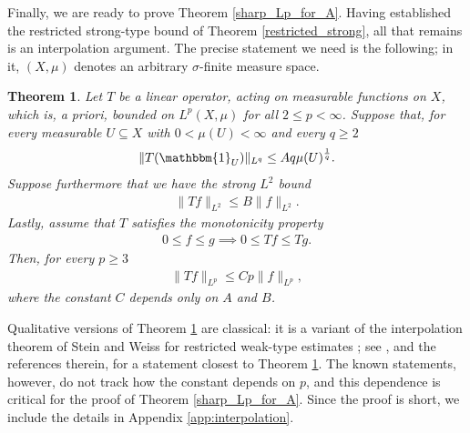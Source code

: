 \documentclass[oneside]{amsart}
\newtheorem{theorem}{Theorem}
\theoremstyle{definition}
\theoremstyle{plain}
\numberwithin{equation}{section}
\numberwithin{theorem}{section}
\newcommand{\ind}{\mathbbm{1}}
\begin{document}
Finally, we are ready to prove Theorem \ref{sharp_Lp_for_A}.
Having established the restricted strong-type bound of Theorem
\ref{restricted_strong}, all that remains is an interpolation argument.
The precise statement we need is the following; in it, $(X, \mu)$ denotes
an arbitrary $\sigma$-finite measure space.
\begin{theorem} \label{interpolation}
  Let $T$ be a linear operator, acting on measurable functions on $X$,
  which is, a priori, bounded on $L^p(X, \mu)$ for all
  $2 \leq p < \infty$.
  Suppose that, for every measurable $U \subseteq X$ with $0 < \mu(U) < \infty$
  and every $q \geq 2$
  \begin{align} \label{interpolation:hypothesis}
    \|T(\ind_U)\|_{L^{q}} \leq Aq \mu(U)^{\frac{1}{q}}.
  \end{align}
  Suppose furthermore that we have the strong $L^2$ bound
  \begin{align} \label{interpolation:strongL2}
    \|Tf\|_{L^2} \leq B \|f\|_{L^2}.
  \end{align}
  Lastly, assume that $T$ satisfies the monotonicity property
  \begin{align*}
    0 \leq f \leq g \implies 0 \leq Tf \leq Tg.
  \end{align*}
  Then, for every $p \geq 3$
  \begin{align*}
    \|Tf\|_{L^p} \leq Cp\|f\|_{L^p},
  \end{align*}
  where the constant $C$ depends only on $A$ and $B$.
\end{theorem}
Qualitative versions of Theorem \ref{interpolation} are classical: it is
a variant of the interpolation theorem of Stein and Weiss for restricted
weak-type estimates \cite{SteinWeiss1959}; see
\cite[Corollary 1.4.22]{GrafakosClassical}, and the references therein,
for a statement closest to Theorem \ref{interpolation}.
The known statements, however, do not track how the constant depends on
$p$, and this dependence is critical for the proof of Theorem
\ref{sharp_Lp_for_A}.
Since the proof is short, we include the details in Appendix
\ref{app:interpolation}.
\end{document}
